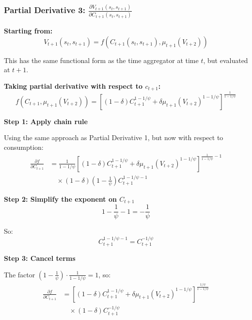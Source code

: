 \documentclass{beamer}
\begin{document}
\begin{frame}[allowframebreaks]
    \frametitle{Partial Derivative 3: $\frac{\partial V_{t+1}(s_t, s_{t+1})}{\partial C_{t+1}(s_t, s_{t+1})}$}
    
    \textbf{Starting from:}
    \begin{equation*}
        V_{t+1}(s_t, s_{t+1}) = f(C_{t+1}(s_t, s_{t+1}), \mu_{t+1}(V_{t+2}))
    \end{equation*}
    
    This has the same functional form as the time aggregator at time $t$, but evaluated at $t+1$.
    
    \textbf{Taking partial derivative with respect to $c_{t+1}$:}
    \begin{equation*}
        f(C_{t+1}, \mu_{t+1}(V_{t+2})) = \left[ (1-\delta)C_{t+1}^{1-1/\psi} + \delta\mu_{t+1}(V_{t+2})^{1-1/\psi} \right]^{\frac{1}{1-1/\psi}}
    \end{equation*}
    
    \framebreak
    
    \textbf{Step 1: Apply chain rule}
    
    Using the same approach as Partial Derivative 1, but now with respect to consumption:
    \begin{equation*}
        \begin{aligned}
            \frac{\partial f}{\partial C_{t+1}} &= \frac{1}{1-1/\psi} \left[ (1-\delta)C_{t+1}^{1-1/\psi} + \delta\mu_{t+1}(V_{t+2})^{1-1/\psi} \right]^{\frac{1}{1-1/\psi}-1} \\
            &\quad \times (1-\delta) \left(1 - \frac{1}{\psi}\right) C_{t+1}^{1-1/\psi-1}
        \end{aligned}
    \end{equation*}
    
    \framebreak
    
    \textbf{Step 2: Simplify the exponent on $C_{t+1}$}
    \begin{equation*}
        1 - \frac{1}{\psi} - 1 = -\frac{1}{\psi}
    \end{equation*}
    
    So:
    \begin{equation*}
        C_{t+1}^{1-1/\psi-1} = C_{t+1}^{-1/\psi}
    \end{equation*}
    
    \framebreak
    
    \textbf{Step 3: Cancel terms}
    
    The factor $\left(1 - \frac{1}{\psi}\right) \cdot \frac{1}{1-1/\psi} = 1$, so:
    \begin{equation*}
        \begin{aligned}
            \frac{\partial f}{\partial C_{t+1}} &= \left[ (1-\delta)C_{t+1}^{1-1/\psi} + \delta\mu_{t+1}(V_{t+2})^{1-1/\psi} \right]^{\frac{1/\psi}{1-1/\psi}} \\
            &\quad \times (1-\delta) C_{t+1}^{-1/\psi}
        \end{aligned}
    \end{equation*}
    

\end{frame}
\end{document}
